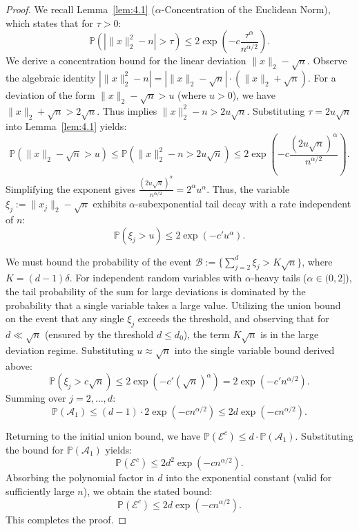 \documentclass[10pt,a4paper]{amsart}
\begin{document}
\begin{proof}
We recall Lemma~\ref{lem:4.1} ($\alpha$-Concentration of the Euclidean Norm), which states that for $\tau > 0$:
\begin{equation}
\mathbb{P}(|\|x\|_2^2 - n| > \tau) \le 2 \exp\left( -c \frac{\tau^\alpha}{n^{\alpha/2}} \right).
\end{equation}
We derive a concentration bound for the linear deviation $\|x\|_2 - \sqrt{n}$. Observe the algebraic identity $|\|x\|_2^2 - n| = |\|x\|_2 - \sqrt{n}| \cdot (\|x\|_2 + \sqrt{n})$. For a deviation of the form $\|x\|_2 - \sqrt{n} > u$ (where $u > 0$), we have $\|x\|_2 + \sqrt{n} > 2\sqrt{n}$. Thus implies $\|x\|_2^2 - n > 2u\sqrt{n}$. Substituting $\tau = 2u\sqrt{n}$ into Lemma~\ref{lem:4.1} yields:
\begin{equation}
\mathbb{P}(\|x\|_2 - \sqrt{n} > u) \le \mathbb{P}(\|x\|_2^2 - n > 2u\sqrt{n}) \le 2 \exp\left( -c \frac{(2u\sqrt{n})^\alpha}{n^{\alpha/2}} \right).
\end{equation}
Simplifying the exponent gives $\frac{(2u\sqrt{n})^\alpha}{n^{\alpha/2}} = 2^\alpha u^\alpha$. Thus, the variable $\xi_j := \|x_j\|_2 - \sqrt{n}$ exhibits $\alpha$-subexponential tail decay with a rate independent of $n$:
\begin{equation}
\mathbb{P}(\xi_j > u) \le 2 \exp(-c' u^\alpha).
\end{equation}

We must bound the probability of the event $\mathcal{B} := \{ \sum_{j=2}^d \xi_j > K \sqrt{n} \}$, where $K = (d-1)\delta$. For independent random variables with $\alpha$-heavy tails ($\alpha \in (0, 2]$), the tail probability of the sum for large deviations is dominated by the probability that a single variable takes a large value. Utilizing the union bound on the event that any single $\xi_j$ exceeds the threshold, and observing that for $d \ll \sqrt{n}$ (ensured by the threshold $d \le d_0$), the term $K\sqrt{n}$ is in the large deviation regime. Substituting $u \approx \sqrt{n}$ into the single variable bound derived above:
\begin{equation}
\mathbb{P}(\xi_j > c \sqrt{n}) \le 2 \exp(-c' (\sqrt{n})^\alpha) = 2 \exp(-c' n^{\alpha/2}).
\end{equation}
Summing over $j=2, \dots, d$:
\begin{equation}
\mathbb{P}(\mathcal{A}_1) \le (d-1) \cdot 2 \exp(-c n^{\alpha/2}) \le 2d \exp(-c n^{\alpha/2}).
\end{equation}

Returning to the initial union bound, we have $\mathbb{P}(\mathcal{E}^c) \le d \cdot \mathbb{P}(\mathcal{A}_1)$. Substituting the bound for $\mathbb{P}(\mathcal{A}_1)$ yields:
\begin{equation}
\mathbb{P}(\mathcal{E}^c) \le 2d^2 \exp(-c n^{\alpha/2}).
\end{equation}
Absorbing the polynomial factor in $d$ into the exponential constant (valid for sufficiently large $n$), we obtain the stated bound:
\begin{equation}
\mathbb{P}(\mathcal{E}^c) \le 2d \exp(-c n^{\alpha/2}).
\end{equation}
This completes the proof.
\end{proof}
\end{document}
